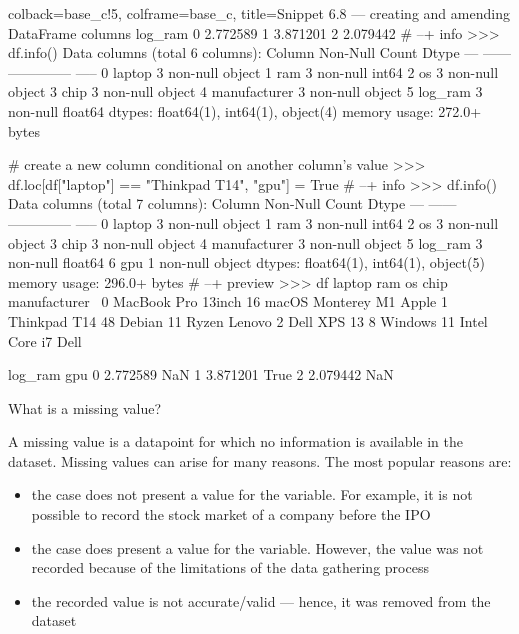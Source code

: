 \documentclass[a4paper,11pt]{book}
\newcommand{\question}[1]{%
    \begin{tcolorbox}[colback=comp_c!10,colframe=comp_c,sidebyside align=top,width=\linewidth,before skip=1ex]
        #1
    \end{tcolorbox}
    \switchcolumn%
}
\newcommand{\note}[1]{%
    \begin{tcolorbox}[colback=white!0,colframe=white!10,width=\linewidth,before skip=1ex]
        #1
    \end{tcolorbox}
}
\begin{document}
\begin{pythoncode}[linenos=True]{colback=base_c!5, colframe=base_c, title=\sffamily Snippet 6.8 --- creating and amending DataFrame columns}
    log_ram  
0  2.772589  
1  3.871201  
2  2.079442  
# --+ info
>>> df.info()
Data columns (total 6 columns):
     Column        Non-Null Count  Dtype  
---  ------        --------------  -----  
 0   laptop        3 non-null      object 
 1   ram           3 non-null      int64  
 2   os            3 non-null      object 
 3   chip          3 non-null      object 
 4   manufacturer  3 non-null      object 
 5   log_ram       3 non-null      float64
dtypes: float64(1), int64(1), object(4)
memory usage: 272.0+ bytes

# create a new column conditional on another column's value
>>> df.loc[df["laptop"] == "Thinkpad T14", "gpu"] = True
# --+ info
>>> df.info()
Data columns (total 7 columns):
     Column        Non-Null Count  Dtype  
---  ------        --------------  -----  
 0   laptop        3 non-null      object 
 1   ram           3 non-null      int64  
 2   os            3 non-null      object 
 3   chip          3 non-null      object 
 4   manufacturer  3 non-null      object 
 5   log_ram       3 non-null      float64
 6   gpu           1 non-null      object 
dtypes: float64(1), int64(1), object(5)
memory usage: 296.0+ bytes
# --+ preview
>>> df
               laptop  ram              os           chip manufacturer  \
0  MacBook Pro 13inch   16  macOS Monterey             M1        Apple   
1        Thinkpad T14   48       Debian 11          Ryzen       Lenovo   
2         Dell XPS 13    8      Windows 11  Intel Core i7         Dell   

    log_ram   gpu  
0  2.772589   NaN  
1  3.871201  True  
2  2.079442   NaN  
\end{pythoncode}

\begin{paracol}{2}
	\question{\raggedright What is a missing value?}
	\note{A missing value is a datapoint for which no information is available in the dataset. Missing values can arise for many reasons. The most popular reasons are:
	
	\begin{itemize}
		\item the case does not present a value for the variable. For example, it is not possible to record the stock market of a company before the IPO
		\item the case does present a value for the variable. However, the value was not recorded because of the limitations of the data gathering process
		\item the recorded value is not accurate/valid --- hence, it was removed from the dataset
	\end{itemize}
	}
\end{paracol}
\end{document}
